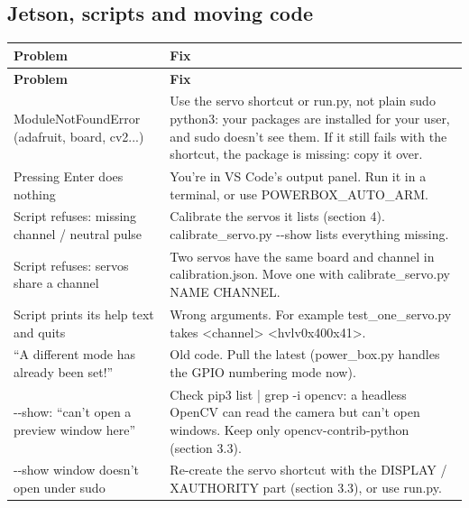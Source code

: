 \documentclass[11pt,letterpaper]{article}
\newcommand{\code}[1]{\textcolor{codeblue}{\ttfamily\smaller\relax #1}}
\begin{document}
\subsection{Jetson, scripts and moving code}
{\small
\begin{longtable}{|>{\raggedright\arraybackslash}p{}|>{\raggedright\arraybackslash}p{}|}
\hline
\rowcolor{tblhead}\textbf{Problem} & \textbf{Fix} \\ \hline
\endfirsthead
\hline
\rowcolor{tblhead}\textbf{Problem} & \textbf{Fix} \\ \hline
\endhead
\code{ModuleNotFoundError} (adafruit, board, cv2...) & Use the \code{servo} shortcut or \code{run.py}, not plain \code{sudo python3}: your packages are installed for your user, and sudo doesn't see them. If it still fails with the shortcut, the package is missing: copy it over. \\ \hline
Pressing Enter does nothing & You're in VS Code's output panel. Run it in a terminal, or use \code{POWERBOX\_\allowbreak{}AUTO\_\allowbreak{}ARM}. \\ \hline
Script refuses: missing channel / neutral pulse & Calibrate the servos it lists (section 4). \code{calibrate\_\allowbreak{}servo.py -{}-{}show} lists everything missing. \\ \hline
Script refuses: servos share a channel & Two servos have the same board and channel in \code{calibration.json}. Move one with \code{calibrate\_\allowbreak{}servo.py NAME CHANNEL}. \\ \hline
Script prints its help text and quits & Wrong arguments. For example \code{test\_\allowbreak{}one\_\allowbreak{}servo.py} takes \code{<channel> <hv\textbar{}lv\textbar{}0x40\textbar{}0x41>}. \\ \hline
``A different mode has already been set!'' & Old code. Pull the latest (\code{power\_\allowbreak{}box.py} handles the GPIO numbering mode now). \\ \hline
\code{-{}-{}show}: ``can't open a preview window here'' & Check \code{pip3 list | grep -{}i opencv}: a headless OpenCV can read the camera but can't open windows. Keep only \code{opencv-{}\allowbreak{}contrib-{}\allowbreak{}python} (section 3.3). \\ \hline
\code{-{}-{}show} window doesn't open under sudo & Re-create the \code{servo} shortcut with the \code{DISPLAY} / \code{XAUTHORITY} part (section 3.3), or use \code{run.py}. \\ \hline

\end{longtable}}
\end{document}
